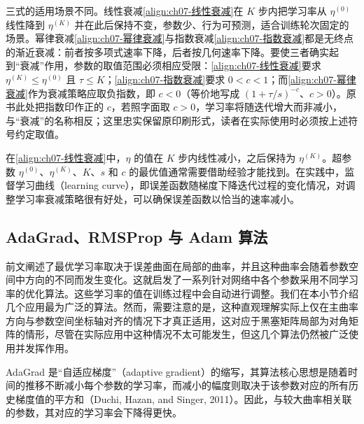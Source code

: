 \documentclass[../../main.tex]{subfiles}
\begin{document}
\begin{remark}
三式的适用场景不同。线性衰减\eqref{align:ch07-线性衰减}在 $K$ 步内把学习率从 $\eta^{(0)}$ 线性降到 $\eta^{(K)}$ 并在此后保持不变，参数少、行为可预测，适合训练轮次固定的场景。幂律衰减\eqref{align:ch07-幂律衰减}与指数衰减\eqref{align:ch07-指数衰减}都是无终点的渐近衰减：前者按多项式速率下降，后者按几何速率下降。要使三者确实起到“衰减”作用，参数的取值范围必须相应受限：\eqref{align:ch07-线性衰减}要求 $\eta^{(K)}\leqslant\eta^{(0)}$ 且 $\tau\leqslant K$；\eqref{align:ch07-指数衰减}要求 $0<c<1$；而\eqref{align:ch07-幂律衰减}作为衰减策略应取负指数，即 $c<0$（等价地写成 $(1+\tau/s)^{-c}$、$c>0$）。原书此处把指数印作正的 $c$，若照字面取 $c>0$，学习率将随迭代增大而非减小，与“衰减”的名称相反；这里忠实保留原印刷形式，读者在实际使用时必须按上述符号约定取值。
\end{remark}

在\eqref{align:ch07-线性衰减}中，$\eta$ 的值在 $K$ 步内线性减小，之后保持为 $\eta^{(K)}$。超参数 $\eta^{(0)}$、$\eta^{(K)}$、$K$、$s$ 和 $c$ 的最优值通常需要借助经验才能找到。在实践中，监督学习曲线（learning curve），即误差函数随梯度下降迭代过程的变化情况，对调整学习率衰减策略很有好处，可以确保误差函数以恰当的速率减小。

\subsection{AdaGrad、RMSProp 与 Adam 算法}\label{subsection:ch07-自适应学习率}

前文阐述了最优学习率取决于误差曲面在局部的曲率，并且这种曲率会随着参数空间中方向的不同而发生变化。这就启发了一系列针对网络中各个参数采用不同学习率的优化算法。这些学习率的值在训练过程中会自动进行调整。我们在本小节介绍几个应用最为广泛的算法。然而，需要注意的是，这种直观理解实际上仅在主曲率方向与参数空间坐标轴对齐的情况下才真正适用，这对应于黑塞矩阵局部为对角矩阵的情形，尽管在实际应用中这种情况不太可能发生，但这几个算法仍然被广泛使用并发挥作用。

AdaGrad 是“自适应梯度”（adaptive gradient）的缩写，其算法核心思想是随着时间的推移不断减小每个参数的学习率，而减小的幅度则取决于该参数对应的所有历史梯度值的平方和（Duchi, Hazan, and Singer, 2011）。因此，与较大曲率相关联的参数，其对应的学习率会下降得更快。
\end{document}
